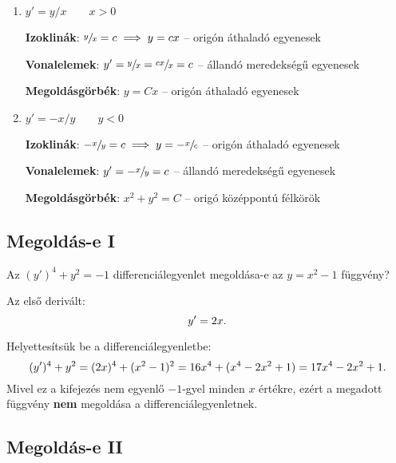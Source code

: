 \documentclass{szb-solution}
\begin{document}
\begin{enumerate}
  \item $y' = y / x \qquad x > 0$

        \textbf{Izoklinák}:
        $\sfrac{y}{x} = c \implies y = cx$
        \quad -- \quad origón áthaladó egyenesek

        \textbf{Vonalelemek}:
        $y' = \sfrac{y}{x} = \sfrac{cx}{x} = c$
        \quad -- \quad állandó meredekségű egyenesek

        \textbf{Megoldásgörbék}:
        $y = Cx$
        \quad -- \quad origón áthaladó egyenesek

  \item $y' = -x / y \qquad y < 0$

        \textbf{Izoklinák}:
        $-\sfrac{x}{y} = c \implies y = -\sfrac{x}{c}$
        \quad -- \quad origón áthaladó egyenesek

        \textbf{Vonalelemek}:
        $y' = -\sfrac{x}{y} = c$
        \quad -- \quad állandó meredekségű egyenesek

        \textbf{Megoldásgörbék}:
        $x^2 + y^2 = C$
        \quad -- \quad origó középpontú félkörök
\end{enumerate}


\subsection{Megoldás-e I}

Az $(y')^4 + y^2 = -1$ differenciálegyenlet megoldása-e az $y = x^2 - 1$
függvény?

Az első derivált:
$$
  y' = 2x
  \text.
$$

Helyettesítsük be a differenciálegyenletbe:
$$
  (y')^4 + y^2
  = (2x)^4 + (x^2 - 1)^2
  = 16x^4 + (x^4 - 2x^2 + 1)
  = 17x^4 - 2x^2 + 1
  \text.
$$
Mivel ez a kifejezés nem egyenlő $-1$-gyel minden $x$ értékre, ezért a
megadott függvény \textbf{nem} megoldása a differenciálegyenletnek.


\subsection{Megoldás-e II}
\end{document}

